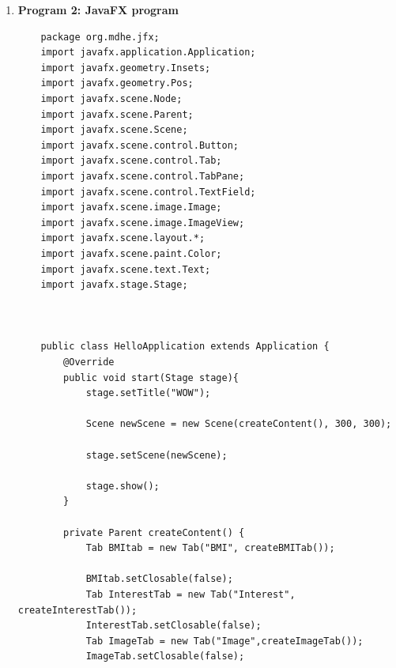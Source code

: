 \documentclass{book}
\begin{document}
{\begin{enumerate}
\begin{itemize}
\begin{itemize}
{                }
                \item{ \textbf{View Frame}
                }
            \end{itemize}


        \end{itemize}

        \item \textbf{Program 2: JavaFX program}

        \begin{verbatim}
    package org.mdhe.jfx;
    import javafx.application.Application;
    import javafx.geometry.Insets;
    import javafx.geometry.Pos;
    import javafx.scene.Node;
    import javafx.scene.Parent;
    import javafx.scene.Scene;
    import javafx.scene.control.Button;
    import javafx.scene.control.Tab;
    import javafx.scene.control.TabPane;
    import javafx.scene.control.TextField;
    import javafx.scene.image.Image;
    import javafx.scene.image.ImageView;
    import javafx.scene.layout.*;
    import javafx.scene.paint.Color;
    import javafx.scene.text.Text;
    import javafx.stage.Stage;



    public class HelloApplication extends Application {
        @Override
        public void start(Stage stage){
            stage.setTitle("WOW");

            Scene newScene = new Scene(createContent(), 300, 300);

            stage.setScene(newScene);

            stage.show();
        }

        private Parent createContent() {
            Tab BMItab = new Tab("BMI", createBMITab());

            BMItab.setClosable(false);
            Tab InterestTab = new Tab("Interest", createInterestTab());
            InterestTab.setClosable(false);
            Tab ImageTab = new Tab("Image",createImageTab());
            ImageTab.setClosable(false);


\end{verbatim}
\end{enumerate}}
\end{document}

